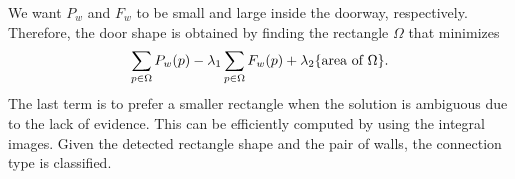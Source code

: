 We want $P_w$ and $F_w$ to be small and large inside the doorway,
respectively. Therefore, the door shape is obtained by finding the
rectangle $\Omega$ that minimizes
\begin{eqnarray}
 \sum_{p\in\Omega} P_w(p)
  - \lambda_1 \sum_{p\in\Omega} F_w(p) + \lambda_2 \{\mbox{area of\
  }\Omega\}.
\end{eqnarray}
The last term is to prefer a smaller rectangle when the solution is
ambiguous due to the lack of evidence. This can be efficiently computed
by using the integral images.  Given the detected rectangle shape and
the pair of walls, the connection type is classified.
%
%
%
%
%
%
%
%
